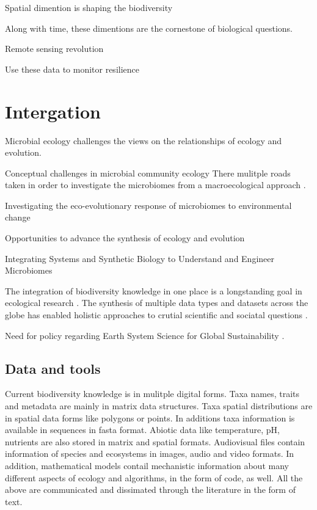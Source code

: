 Spatial dimention is shaping the biodiversity

Along with time, these dimentions are the cornestone of 
biological questions. 


Remote sensing revolution

Use these data to monitor resilience \cite{Lenton2022resilience}

\section{Intergation}
\label{sec:crete-integration}

Microbial ecology challenges the views on the relationships of ecology and evolution.

Conceptual challenges in microbial community ecology \cite{prosser2020Conceptual}
There mulitple roads taken in order to investigate the microbiomes from a macroecological
approach \cite{Mascarenhas2020}.

Investigating the eco-evolutionary response of microbiomes to environmental change \cite{martiny2023Investigating}

Opportunities to advance the synthesis of ecology and evolution \cite{loreau2023Opportunities}

Integrating Systems and Synthetic Biology to Understand and Engineer Microbiomes \cite{Leggieri2021}

The integration of biodiversity knowledge in one place is a longstanding
goal in ecological research \cite{Walter_2012}. The synthesis of multiple
data types and datasets across the globe has enabled 
holistic approaches to crutial scientific and sociatal questions \cite{heberling_j_mason_data_2021}.

Need for policy regarding Earth System Science for Global
Sustainability \cite{reid2010earth}.

\subsection{Data and tools}
\label{sec:data-tools}

Current biodiversity knowledge is in mulitple digital forms. 
Taxa names, traits and metadata are mainly in matrix data
structures. Taxa spatial distributions are in spatial data
forms like polygons or points. In additions taxa information
is available in sequences in fasta format. Abiotic data like 
temperature, pH, nutrients are also stored in matrix
and spatial formats. Audiovisual files contain information
of species and ecosystems in images, audio and video formats.
In addition, mathematical models contail mechanistic information
about many different aspects of ecology and algorithms, in the 
form of code, as well. All the above are communicated and dissimated through the
literature in the form of text.

